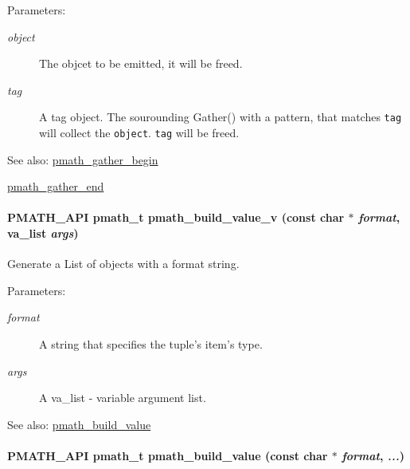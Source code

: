 \begin{Desc}
\item[Parameters:]
\begin{description}
\item[{\em object}]The objcet to be emitted, it will be freed. \item[{\em tag}]A tag object. The sourounding Gather() with a pattern, that matches {\tt tag} will collect the {\tt object}. {\tt tag} will be freed.\end{description}
\end{Desc}
\begin{Desc}
\item[See also:]\hyperlink{group__helpers_g077f3730ca4275b87d9a35bce6013e45}{pmath\_\-gather\_\-begin} 

\hyperlink{group__helpers_ga2f732b35703986263e3a15592b4a46e}{pmath\_\-gather\_\-end} \end{Desc}
\hypertarget{group__helpers_g96660afa0732edf675653eb6ddeab0a4}{
\paragraph[{pmath\_\-build\_\-value\_\-v}]{\setlength{\rightskip}{0pt plus 5cm}PMATH\_\-API {\bf pmath\_\-t} pmath\_\-build\_\-value\_\-v (const char $\ast$ {\em format}, \/  va\_\-list {\em args})}\hfill}
\label{group__helpers_g96660afa0732edf675653eb6ddeab0a4}


Generate a List of objects with a format string. 

\begin{Desc}
\item[Parameters:]
\begin{description}
\item[{\em format}]A string that specifies the tuple's item's type. \item[{\em args}]A va\_\-list - variable argument list.\end{description}
\end{Desc}
\begin{Desc}
\item[See also:]\hyperlink{group__helpers_g13a748aa283c5f5408cce037d3ad224d}{pmath\_\-build\_\-value} \end{Desc}
\hypertarget{group__helpers_g13a748aa283c5f5408cce037d3ad224d}{
\paragraph[{pmath\_\-build\_\-value}]{\setlength{\rightskip}{0pt plus 5cm}PMATH\_\-API {\bf pmath\_\-t} pmath\_\-build\_\-value (const char $\ast$ {\em format}, \/   {\em ...})}\hfill}
\label{group__helpers_g13a748aa283c5f5408cce037d3ad224d}


